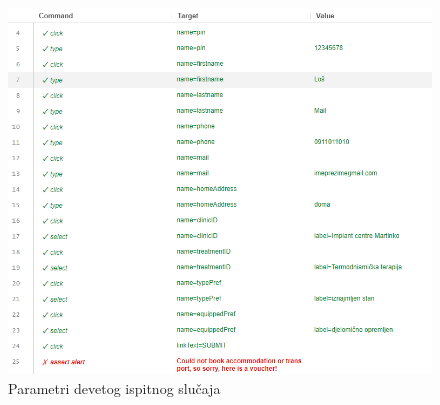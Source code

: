 			\begin{figure}[H]
				\centering
				\includegraphics[width=\textwidth]{"slike/Selenium/pacijent testovi/registerPatientBad_parameters.png"}
				\caption{Parametri devetog ispitnog slučaja}
				\label{fig: registerPatientBad_parameters}
			\end{figure}

